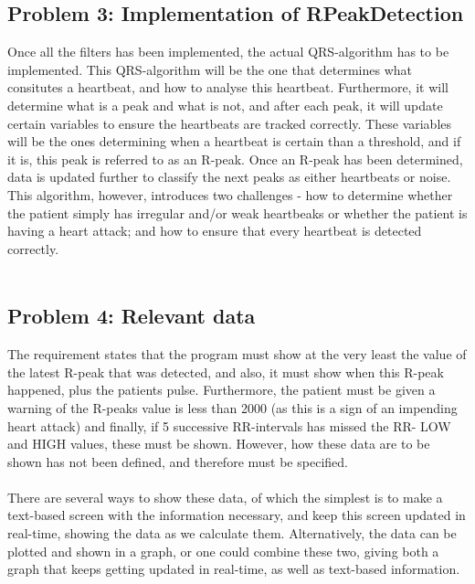 \documentclass[12pt,a4paper]{article}
\begin{document}
\subsection{Problem 3: Implementation of RPeakDetection}
	Once all the filters has been implemented, the actual QRS-algorithm has to be implemented. This QRS-algorithm will be the one that determines what consitutes a heartbeat, and how to analyse this heartbeat. Furthermore, it will determine what is a peak and what is not, and after each peak, it will update certain variables to ensure the heartbeats are tracked correctly. These variables will be the ones determining when a heartbeat is certain than a threshold, and if it is, this peak is referred to as an R-peak. Once an R-peak has been determined, data is updated further to classify the next peaks as either heartbeats or noise. This algorithm, however, introduces two challenges - how to determine whether the patient simply has irregular and/or weak heartbeaks or whether the patient is having a heart attack; and how to ensure that every heartbeat is detected correctly.\\
	\\

\subsection{Problem 4: Relevant data}
	The requirement states that the program must show at the very least the value of the latest R-peak that was detected, and also, it must show when this R-peak happened, plus the patients pulse. Furthermore, the patient must be given a warning of the R-peaks value is less than 2000 (as this is a sign of an impending heart attack) and finally, if 5 successive RR-intervals has missed the RR- LOW and HIGH values, these must be shown. However, how these data are to be shown has not been defined, and therefore must be specified.\\
	\\
	There are several ways to show these data, of which the simplest is to make a text-based screen with the information necessary, and keep this screen updated in real-time, showing the data as we calculate them. Alternatively, the data can be plotted and shown in a graph, or one could combine these two, giving both a graph that keeps getting updated in real-time, as well as text-based information.\\
\end{document}
